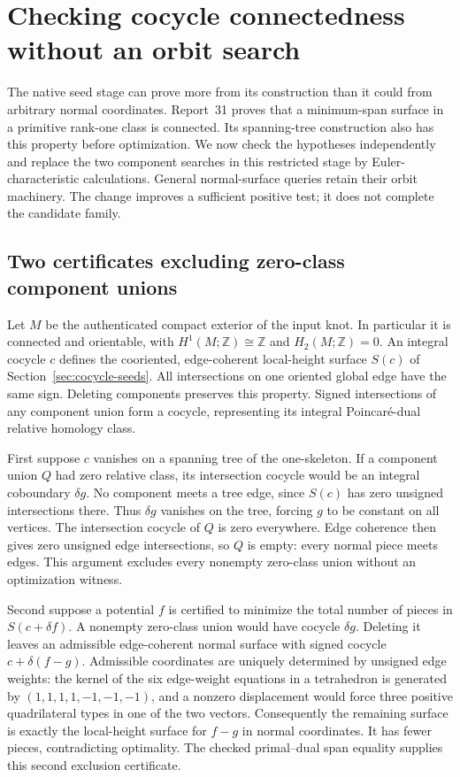 \section{Checking cocycle connectedness without an orbit search}
\label{sec:cocycle-connectivity}

The native seed stage can prove more from its construction than it could
from arbitrary normal coordinates. Report~31 proves that a minimum-span
surface in a primitive rank-one class is connected. Its spanning-tree
construction also has this property before optimization. We now check the
hypotheses independently and replace the two component searches in this
restricted stage by Euler-characteristic calculations. General normal-surface
queries retain their orbit machinery. The change improves a sufficient
positive test; it does not complete the candidate family.

\subsection{Two certificates excluding zero-class component unions}

Let $M$ be the authenticated compact exterior of the input knot. In
particular it is connected and orientable, with
$H^1(M;\mathbb Z)\cong\mathbb Z$ and $H_2(M;\mathbb Z)=0$.
An integral cocycle $c$ defines the cooriented, edge-coherent local-height
surface $S(c)$ of Section~\ref{sec:cocycle-seeds}. All intersections on
one oriented global edge have the same sign. Deleting components preserves
this property. Signed intersections of any component union form a cocycle,
representing its integral Poincar\'e-dual relative homology class.

First suppose $c$ vanishes on a spanning tree of the one-skeleton. If a
component union $Q$ had zero relative class, its intersection cocycle would
be an integral coboundary $\delta g$. No component meets a tree edge,
since $S(c)$ has zero unsigned intersections there. Thus $\delta g$
vanishes on the tree, forcing $g$ to be constant on all vertices. The
intersection cocycle of $Q$ is zero everywhere. Edge coherence then gives
zero unsigned edge intersections, so $Q$ is empty: every normal piece
meets edges. This argument excludes every nonempty zero-class union
without an optimization witness.

Second suppose a potential $f$ is certified to minimize the total number
of pieces in $S(c+\delta f)$. A nonempty zero-class union would have
cocycle $\delta g$. Deleting it leaves an admissible edge-coherent normal
surface with signed cocycle $c+\delta(f-g)$. Admissible coordinates are
uniquely determined by unsigned edge weights: the kernel of the six
edge-weight equations in a tetrahedron is generated by
$(1,1,1,1,-1,-1,-1)$, and a nonzero displacement would force three
positive quadrilateral types in one of the two vectors. Consequently the
remaining surface is exactly the local-height surface for $f-g$ in normal
coordinates. It has fewer pieces, contradicting optimality. The checked
primal--dual span equality supplies this second exclusion certificate.

